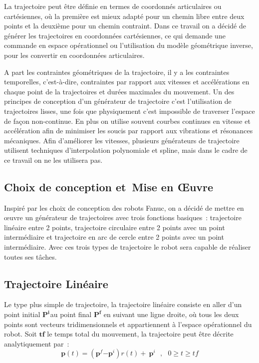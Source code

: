 \documentclass{article} %
\begin{document}
La trajectoire peut \^{e}tre d\'{e}finie en termes de coordonn\'{e}s articulaires ou cart\'{e}siennes, o\`{u} la premi\`{e}re est mieux adapt\'{e} pour un chemin libre entre deux points et la deuxi\`{e}me pour un chemin contraint. Dans ce travail on a d\'{e}cid\'{e} de g\'{e}n\'{e}rer les trajectoires en coordonn\'{e}es cart\'{e}siennes, ce qui demande une commande en espace op\'{e}rationnel ou l'utilisation du mod\`{e}le g\'{e}om\'{e}trique inverse, pour les convertir en coordonn\'{e}es articulaires. 

A part les contraintes g\'{e}om\'{e}triques de la trajectoire, il y a les contraintes temporelles, c'est-\`{a}-dire, contraintes par rapport aux vitesses et acc\'{e}l\'{e}rations en chaque point de la trajectoires et dur\'{e}es maximales du mouvement. Un des principes de conception d'un g\'{e}n\'{e}rateur de trajectoire c'est l'utilisation de trajectoires lisses, une fois que physiquement c'est impossible de traverser l'espace de fa\c{c}on non-continue. En plus on utilise souvent courbes continues en vitesse et acc\'{e}l\'{e}ration afin de minimiser les soucis par rapport aux vibrations et r\'{e}sonances m\'{e}caniques. Afin d'am\'{e}liorer les vitesses, plusieurs g\'{e}n\'{e}rateurs de trajectoire utilisent techniques d'interpolation polynomiale et spline, mais dans le cadre de ce travail on ne les utilisera pas.

\noindent 

\subsection{Choix de conception et~Mise en {\OE}uvre}

\noindent 

 Inspir\'{e} par les choix de conception des robots Fanuc, on a d\'{e}cid\'{e} de mettre en {\oe}uvre un g\'{e}n\'{e}rateur de trajectoires avec trois fonctions basiques~: trajectoire lin\'{e}aire entre 2 points, trajectoire circulaire entre 2 points avec un point interm\'{e}diaire et trajectoire en arc de cercle entre 2 points avec un point interm\'{e}diaire. Avec ces trois types de trajectoire le robot sera capable de r\'{e}aliser toutes ses t\^{a}ches.

    
\subsection{Trajectoire Lin\'{e}aire}

\noindent
 
 Le type plus simple de trajectoire, la trajectoire lin\'{e}aire consiste en aller d'un point initial ${\boldsymbol{P}}^{\boldsymbol{i}}$${}^{ }$au point final ${\boldsymbol{P}}^{\boldsymbol{f}}$\textbf{ }en suivant une ligne droite, o\`{u} tous les deux points sont vecteurs tridimensionnels et appartiennent \`{a} l'espace op\'{e}rationnel du robot. Soit $\boldsymbol{tf}$ le temps total du mouvement, la trajectoire peut \^{e}tre d\'{e}crite analytiquement par~:
\[\boldsymbol{p}\left(t\right)=\left({\boldsymbol{p}}^f{-\boldsymbol{p}}^i\right) r\left(t\right)+\ {\boldsymbol{p}}^i\ \ \ ,\ \ \ 0\ge t\ge tf\] 
\end{document}
